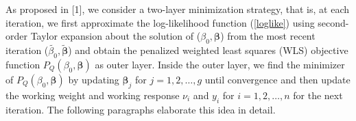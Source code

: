 \documentclass[paper=a4, fontsize=11pt]{scrartcl} %
\begin{document}
As proposed in [1], we consider a two-layer minimization strategy, that is, at each iteration, we first approximate the log-likelihood function (\ref{loglike}) using second-order Taylor expansion about the solution of ($\beta_{0},\boldsymbol{\beta}$) from the most recent iteration ($\tilde{\beta_{0}},\tilde{\boldsymbol{\beta}}$) and obtain the penalized weighted least squares (WLS) objective function $P_{Q}(\beta_{0},\boldsymbol{\beta})$ as outer layer. Inside the outer layer, we find the minimizer of $P_{Q}(\beta_{0},\boldsymbol{\beta})$ by updating $\boldsymbol{\beta}_{j}$ for $j=1,2,\dots,g$ until convergence and then update the working weight and working response $\nu_{i}$ and $y_{i}$ for $i=1,2,\dots,n$ for the next iteration. The following paragraphs elaborate this idea in detail.\\
\end{document}

